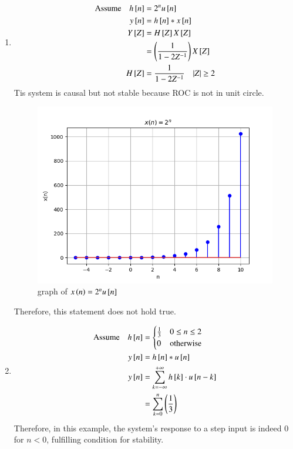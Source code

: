 \documentclass[journal,12pt,twocolumn]{IEEEtran}
\theoremstyle{remark}
\begin{document}
\begin{enumerate}
    \item
    \begin{align}
        \text{Assume}\quad h{}\left[n\right]&=2^nu{}\left[n\right]\\
        y{}\left[n\right]&=h{}\left[n\right]*x{}\left[n\right]\\
        Y{}\left[Z\right]&=H{}\left[Z\right] X{}\left[Z\right]\\
        &=\left(\frac{1}{1-2Z^{-1}}\right)X{}\left[Z\right]\\
        H{}\left[Z\right]&=\frac{1}{1-2Z^{-1}}\quad     |Z|\geq 2
    \end{align}
    Tis system is causal but not stable because ROC is not in unit circle.
    
    \begin{figure}[ht]
    \renewcommand\thefigure{1}
        \centering
        \includegraphics[width=0.8\linewidth]{figs/graph31.png}
        \caption{graph of $x\left(n\right) = 2^nu{}\left[n\right]$}
    \end{figure}
    Therefore, this statement does not hold true.
    \item
    \begin{align}
        \text{Assume}\quad h{}\left[n\right] &= \begin{cases} 
                \frac{1}{3} & 0\leq n \leq 2 \\
                0 & \text{otherwise}
        \end{cases}\\
        y{}\left[n\right]&=h{}\left[n\right]*u{}\left[n\right]\\
        y{}\left[n\right]&=\sum_{k=-\infty}^{+\infty}h{}\left[k\right]\cdot u{}\left[n-k\right]\\
        &=\sum_{k=0}^{n}\left(\frac{1}{3}\right)
    \end{align}
    Therefore, in this example, the system's response to a step input is indeed $0$ for $n<0$, fulfilling condition for stability.\\

\end{enumerate}
\end{document}

